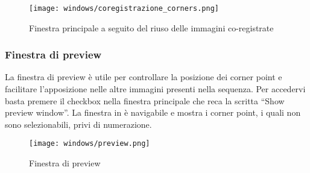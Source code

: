 \begin{figure}[H]
    \centering
    \texttt{[image: windows/coregistrazione\_corners.png]}
    \caption{Finestra principale a seguito del riuso delle immagini co-registrate}
    \label{fig:22}
\end{figure}

\subsubsection{Finestra di preview}
\noindent La finestra di preview è utile per controllare la posizione dei corner point e facilitare l'apposizione nelle altre immagini presenti nella sequenza. Per accedervi basta premere il checkbox nella finestra principale che reca la scritta ``Show preview window''. La finestra in  è navigabile e mostra i corner point, i quali non sono selezionabili, privi di numerazione.

\begin{figure}[H]
    \centering
    \texttt{[image: windows/preview.png]}
    \caption{Finestra di preview}
    \label{fig:23}
\end{figure}